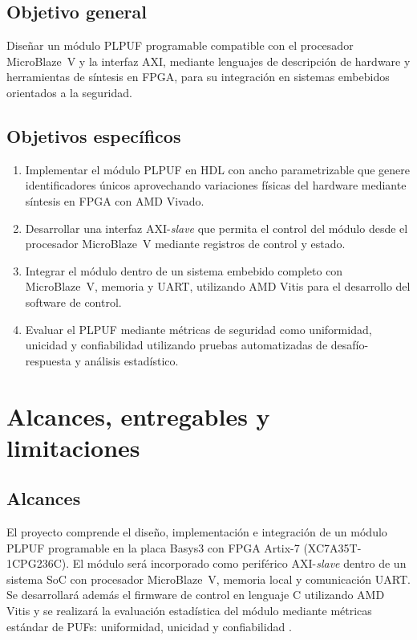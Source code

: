 \subsection{Objetivo general}

Diseñar un módulo PLPUF programable compatible con el procesador MicroBlaze~V y la
interfaz AXI, mediante lenguajes de descripción de hardware y herramientas de síntesis
en FPGA, para su integración en sistemas embebidos orientados a la seguridad.

\subsection{Objetivos específicos}

\begin{enumerate}
\item Implementar el módulo PLPUF en HDL con ancho parametrizable que genere
identificadores únicos aprovechando variaciones físicas del hardware mediante
síntesis en FPGA con AMD Vivado.

\item Desarrollar una interfaz AXI-\textit{slave} que permita el control del módulo
desde el procesador MicroBlaze~V mediante registros de control y estado.

\item Integrar el módulo dentro de un sistema embebido completo con MicroBlaze~V,
memoria y UART, utilizando AMD Vitis para el desarrollo del software de control.

\item Evaluar el PLPUF mediante métricas de seguridad como uniformidad, unicidad y
confiabilidad utilizando pruebas automatizadas de desafío-respuesta y análisis
estadístico.
\end{enumerate}

\section{Alcances, entregables y limitaciones}

\subsection{Alcances}

El proyecto comprende el diseño, implementación e integración de un módulo PLPUF
programable en la placa Basys3 con FPGA Artix-7 (XC7A35T-1CPG236C). El módulo será
incorporado como periférico AXI-\textit{slave} dentro de un sistema SoC con procesador
MicroBlaze~V, memoria local y comunicación UART. Se desarrollará además el firmware de
control en lenguaje C utilizando AMD Vitis y se realizará la evaluación estadística del
módulo mediante métricas estándar de PUFs: uniformidad, unicidad y confiabilidad
\cite{maiti_2012_systematic, wilde_2020_confidence}.

